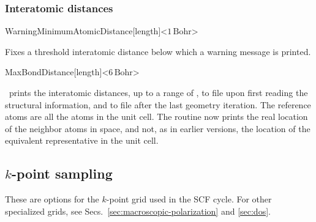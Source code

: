 \subsubsection{Interatomic distances}

\begin{fdfentry}{WarningMinimumAtomicDistance}[length]<$1\,\mathrm{Bohr}$>

  Fixes a threshold interatomic distance below which a warning
  message is printed.

\end{fdfentry}

\begin{fdfentry}{MaxBondDistance}[length]<$6\,\mathrm{Bohr}$>

  \siesta\ prints the interatomic distances, up to a range of , to file
   upon first reading the structural information, and
  to file  after the last geometry
  iteration. The reference atoms are all the atoms in the unit
  cell. The routine now prints the real location of the neighbor atoms
  in space, and not, as in earlier versions, the location of the
  equivalent representative in the unit cell.

\end{fdfentry}



\subsection{\texorpdfstring{$k$}{k}-point sampling}
\label{ssec:k-points}

These are options for the $k$-point grid used in the SCF cycle. For
other specialized grids, see Secs.~\ref{sec:macroscopic-polarization}
and \ref{sec:dos}.

